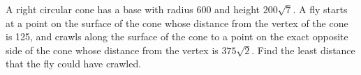A right circular cone has a base with radius 600 and height $200\sqrt{7}$. A fly starts at a point on the surface of the cone whose distance from the vertex of the cone is 125, and crawls along the surface of the cone to a point on the exact opposite side of the cone whose distance from the vertex is $375\sqrt{2}$. Find the least distance that the fly could have crawled.